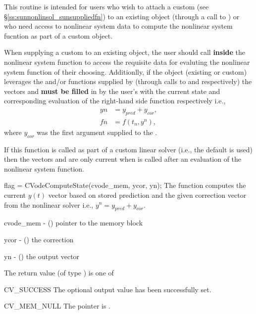 {
  This routine is intended for users who wish to attach a custom
   (see \S\ref{ss:sunnonlinsol_sunsuppliedfn}) to an
  existing  object (through a call to
  ) or who need access to nonlinear system data to
  compute the nonlinear system fucntion as part of a custom
   object.

  When supplying a custom  to an existing
   object, the user should call
   \textbf{inside} the nonlinear system
  function to access the requisite data for evaluting the nonlinear system
  function of their choosing. Additionlly, if the  object
  (existing or custom) leverages the  and/or
   functions supplied by {\cvode} (through calls to
   and  respectively)
  the vectors  and  \textbf{must be filled} in by the user's
   with the current state and corresponding evaluation of
  the right-hand side function respectively i.e.,
  \begin{align*}
    yn &= y_{pred} + y_{cor}, \\
    fn &= f\left(t_{n}, y^n\right),
  \end{align*}
  where $y_{cor}$ was the first argument supplied to the .

  If this function is called as part of a custom linear solver (i.e., the
  default  is used) then the vectors  and 
  are only current when  is called after an
  evaluation of the nonlinear system function.
}
{
  flag = CVodeComputeState(cvode\_mem, ycor, yn);
}
{
  The function computes the current $y(t)$ vector based on stored prediction and
  the given correction vector from the nonlinear solver i.e.,
  $y^n = y_{pred} + y_{cor}$.
}
{
  \begin{args}
    \item[cvode\_mem] - () pointer to the {\cvode} memory block
    \item[ycor] - () the correction
    \item[yn] - () the output vector
  \end{args}
}
{
  The return value  (of type ) is one of
  \begin{args}
  \item[CV\_SUCCESS]
    The optional output value has been successfully set.
  \item[CV\_MEM\_NULL]
    The  pointer is .
  \end{args}
}
{}






